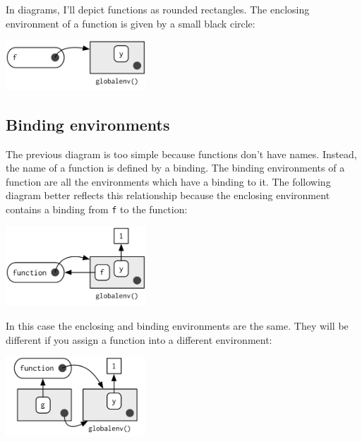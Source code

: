 In diagrams, I'll depict functions as rounded rectangles. The enclosing
environment of a function is given by a small black circle:

\includegraphics[width=2.06in]{diagrams/environments.png/enclosing.png}

\subsection{Binding environments}

The previous diagram is too simple because functions don't have names.
Instead, the name of a function is defined by a binding. The binding
environments of a function are all the environments which have a binding
to it. The following diagram better reflects this relationship because
the enclosing environment contains a binding from \texttt{f} to the
function: 

\includegraphics[width=2.06in]{diagrams/environments.png/binding.png}

In this case the enclosing and binding environments are the same. They
will be different if you assign a function into a different environment:

\begin{Shaded}
\begin{Highlighting}[]
\StringTok{ }\NormalTok{()}
\StringTok{ }
\end{Highlighting}
\end{Shaded}

\includegraphics[width=2.06in]{diagrams/environments.png/binding-2.png}

